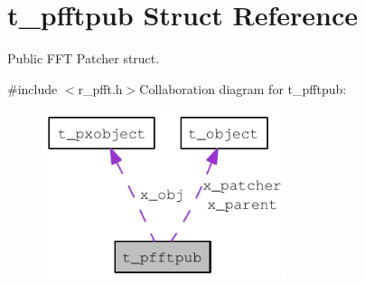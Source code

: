 \hypertarget{structt__pfftpub}{
\section{t\_\-pfftpub Struct Reference}
\label{structt__pfftpub}
}


Public FFT Patcher struct.  


{\ttfamily \#include $<$r\_\-pfft.h$>$}Collaboration diagram for t\_\-pfftpub:\nopagebreak
\begin{figure}[H]
\begin{center}
\leavevmode
\includegraphics[width=202pt]{structt__pfftpub__coll__graph}
\end{center}
\end{figure}
